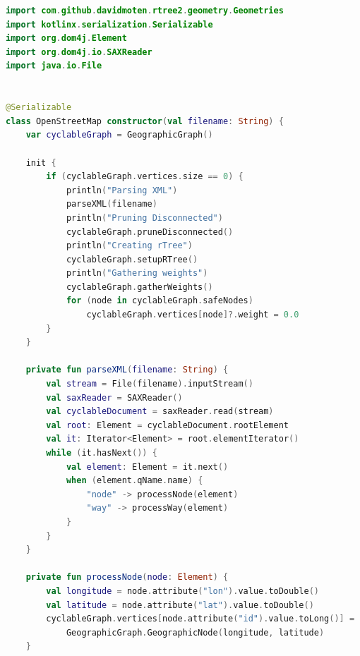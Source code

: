 \documentclass[11pt,twoside,a4paper]{report}
\begin{document}
\begin{lstlisting}[language=kotlin]
import com.github.davidmoten.rtree2.geometry.Geometries
import kotlinx.serialization.Serializable
import org.dom4j.Element
import org.dom4j.io.SAXReader
import java.io.File


@Serializable
class OpenStreetMap constructor(val filename: String) {
    var cyclableGraph = GeographicGraph()

    init {
        if (cyclableGraph.vertices.size == 0) {
            println("Parsing XML")
            parseXML(filename)
            println("Pruning Disconnected")
            cyclableGraph.pruneDisconnected()
            println("Creating rTree")
            cyclableGraph.setupRTree()
            println("Gathering weights")
            cyclableGraph.gatherWeights()
            for (node in cyclableGraph.safeNodes)
                cyclableGraph.vertices[node]?.weight = 0.0
        }
    }

    private fun parseXML(filename: String) {
        val stream = File(filename).inputStream()
        val saxReader = SAXReader()
        val cyclableDocument = saxReader.read(stream)
        val root: Element = cyclableDocument.rootElement
        val it: Iterator<Element> = root.elementIterator()
        while (it.hasNext()) {
            val element: Element = it.next()
            when (element.qName.name) {
                "node" -> processNode(element)
                "way" -> processWay(element)
            }
        }
    }

    private fun processNode(node: Element) {
        val longitude = node.attribute("lon").value.toDouble()
        val latitude = node.attribute("lat").value.toDouble()
        cyclableGraph.vertices[node.attribute("id").value.toLong()] =
            GeographicGraph.GeographicNode(longitude, latitude)
    }


\end{lstlisting}
\end{document}
